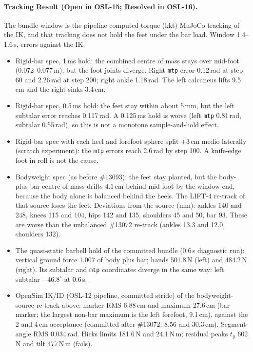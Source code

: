 \documentclass[11pt,a4paper]{article}
\begin{document}
\paragraph{Tracking Result (Open in OSL-15; Resolved in OSL-16).} The bundle window is the pipeline
computed-torque (kkt) MuJoCo tracking of the IK, and that tracking does not
hold the feet under the bar load. Window 1.4--1.6\,s, errors against the IK:
\begin{itemize}[nosep]
\item Rigid-bar spec, 1\,ms hold: the combined centre of mass stays over
  mid-foot (0.072--0.077\,m), but the foot joints diverge. Right
  \texttt{mtp} error 0.12\,rad at step 60 and 2.26\,rad at step 200; right
  ankle 1.18\,rad. The left calcaneus lifts 9.5\,cm and the right sinks
  3.4\,cm.
\item Rigid-bar spec, 0.5\,ms hold: the feet stay within about 5\,mm, but the
  left subtalar error reaches 0.117\,rad. A 0.125\,ms hold is worse (left
  \texttt{mtp} 0.81\,rad, subtalar 0.55\,rad), so this is not a monotone
  sample-and-hold effect.
\item Rigid-bar spec with each heel and forefoot sphere split $\pm3$\,cm
  medio-laterally (scratch experiment): the \texttt{mtp} errors reach
  2.6\,rad by step 100. A knife-edge foot in roll is not the cause.
\item Bodyweight spec (as before \#13093): the feet stay planted, but the
  body-plus-bar centre of mass drifts 4.1\,cm behind mid-foot by the window
  end, because the body alone is balanced behind the heels. The LIFT-4
  re-track of that source loses the feet. Deviations from the source (mm):
  ankles 140 and 248, knees 115 and 104, hips 142 and 135, shoulders 45 and
  50, bar 93. These are worse than the unbalanced \#13072 re-track (ankles
  13.3 and 12.0, shoulders 132).
\item The quasi-static barbell hold of the committed bundle (0.6\,s
  diagnostic run): vertical ground force 1.007 of body plus bar; hands
  501.8\,N (left) and 484.2\,N (right). Its subtalar and \texttt{mtp}
  coordinates diverge in the same way: left subtalar $-46.8^\circ$ at
  0.6\,s.
\item OpenSim IK/ID (OSL-12 pipeline, committed stride) of the
  bodyweight-source re-track above: marker RMS 6.88\,cm and maximum 27.6\,cm (bar marker; the largest
  non-bar maximum is the left forefoot, 9.1\,cm), against the 2 and 4\,cm
  acceptance (committed after \#13072: 8.56 and 30.3\,cm). Segment-angle RMS
  0.034\,rad. Hicks limits 181.6\,N and 24.1\,N\,m; residual peaks $t_y$
  602\,N and tilt 477\,N\,m (fails).
\end{itemize}
\end{document}

